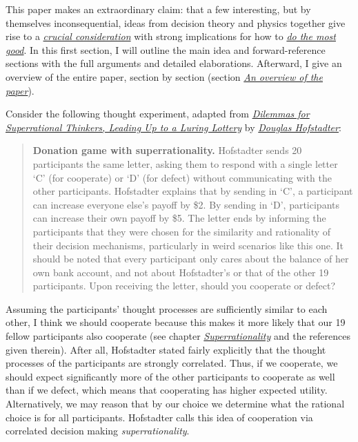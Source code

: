 This paper makes an extraordinary claim: that a few interesting, but by
themselves inconsequential, ideas from decision theory and physics
together give rise to a
\href{https://concepts.effectivealtruism.org/concepts/the-importance-of-crucial-considerations/}{\emph{crucial
consideration}} with strong implications for how to
\href{https://en.wikipedia.org/wiki/Effective_altruism}{\emph{do the
most good}}. In this first section, I will outline the main idea and
forward-reference sections with the full arguments and detailed
elaborations. Afterward, I give an overview of the entire paper, section
by section (section
\protect\hyperlink{an-overview-of-the-paper}{\emph{An overview of the
paper}}).

Consider the following thought experiment, adapted from
\href{https://www.gwern.net/docs/1985-hofstadter\#dilemmas-for-superrational-thinkers-leading-up-to-a-luring-lottery}{\emph{Dilemmas
for Superrational Thinkers, Leading Up to a Luring Lottery}} by
\href{https://en.wikipedia.org/wiki/Douglas_Hofstadter}{\emph{Douglas
Hofstadter}}:

\begin{quote}
\textbf{Donation game with superrationality.} Hofstadter sends 20
participants the same letter, asking them to respond with a single
letter `C' (for cooperate) or `D' (for defect) without communicating
with the other participants. Hofstadter explains that by sending in `C',
a participant can increase everyone else's payoff by \$2. By sending in
`D', participants can increase their own payoff by \$5. The letter ends
by informing the participants that they were chosen for the similarity
and rationality of their decision mechanisms, particularly in weird
scenarios like this one. It should be noted that every participant only
cares about the balance of her own bank account, and not about
Hofstadter's or that of the other 19 participants. Upon receiving the
letter, should you cooperate or defect?
\end{quote}

Assuming the participants' thought processes are sufficiently similar to
each other, I think we should cooperate because this makes it more
likely that our 19 fellow participants also cooperate (see chapter
\protect\hyperlink{superrationality}{\emph{Superrationality}} and
the references given therein). After all, Hofstadter stated fairly
explicitly that the thought processes of the participants are strongly
correlated. Thus, if we cooperate, we should expect significantly more
of the other participants to cooperate as well than if we defect, which
means that cooperating has higher expected utility. Alternatively, we
may reason that by our choice we determine what the rational choice is
for all participants. Hofstadter calls this idea of cooperation via
correlated decision making \emph{superrationality}.

